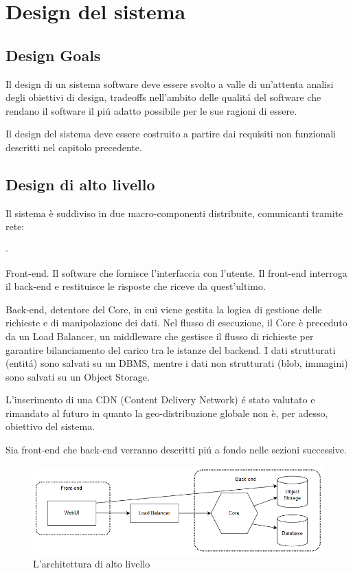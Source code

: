 \chapter{Design del sistema}

\section{Design Goals}
Il design di un sistema software deve essere svolto a valle di un'attenta 
analisi degli obiettivi di design, tradeoffs nell'ambito delle qualitá del 
software che rendano il software il piú adatto possibile per le sue ragioni 
di essere.

Il design del sistema deve essere costruito a partire dai requisiti non funzionali
descritti nel capitolo precedente.

\section{Design di alto livello}
Il sistema è suddiviso in due macro-componenti distribuite, comunicanti tramite 
rete:
\begin{list}{$\cdot$}{}
    \item Front-end. Il software che fornisce l'interfaccia con l'utente. Il front-end 
    interroga il back-end e restituisce le risposte che riceve da quest'ultimo.
    \item Back-end, detentore del Core, in cui viene gestita la logica di gestione delle 
    richieste e di manipolazione dei dati. Nel flusso di esecuzione, il Core è preceduto 
    da un Load Balancer, un middleware che gestisce il flusso di richieste per garantire 
    bilanciamento del carico tra le istanze del backend. I dati strutturati (entitá) sono 
    salvati su un DBMS, mentre i dati non strutturati (blob, immagini) sono salvati su un 
    Object Storage.
\end{list}

L'inserimento di una CDN (Content Delivery Network) é stato valutato e rimandato al 
futuro in quanto la geo-distribuzione globale non è, per adesso, obiettivo del sistema.

Sia front-end che back-end verranno descritti piú a fondo nelle sezioni successive.

\begin{figure}[h]
    \centering
    \includegraphics[width=\textwidth]{assets/diagrams/high-level-arch.png}
    \caption{L'architettura di alto livello}
    \label{fig:Architettura di alto livello}
\end{figure}


